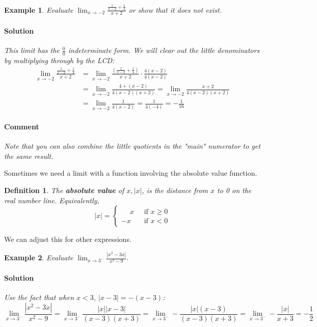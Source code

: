 \documentclass[letterpaper, 11pt, openany]{book}
\theoremstyle{mytheoremstyle}
\newtheorem{definition}{Definition}[section]
\theoremstyle{myexamplestyle}
\newtheorem{example}{Example}[section]
\newenvironment{solution}{\paragraph{\sffamily \smaller \fontseries{b}\selectfont Solution}}{\hfill\faSquare}
\newenvironment{commentary}{\paragraph{\sffamily \smaller \fontseries{b}\selectfont Comment}}{}
\begin{document}
\begin{example}\label{e:limit-rational-functions}
    Evaluate $\displaystyle \lim_{x\to -2} \frac{\frac{1}{x - 2} + \frac{1}{4}}{x + 2}$ or show that it does not exist.
    \begin{solution}
        This limit has the $\frac{0}{0}$ indeterminate form. We will clear out the little denominators by multiplying through by the LCD:
        \begin{align*}
            \lim_{x\to -2} \frac{\frac{1}{x - 2} + \frac{1}{4}}{x + 2}  &= \lim_{x\to -2} \frac{\left(\frac{1}{x - 2} + \frac{1}{4}\right)}{x + 2} \cdot \frac{4(x - 2)}{4(x - 2)} \\
                                                                        &= \lim_{x\to -2} \frac{4 + (x-2)}{4(x-2)(x+2)} = \lim_{x\to -2}\frac{x + 2}{4(x-2)(x+2)}\\
                                                                        &= \lim_{x\to -2} \frac{1}{4(x-2)} = \frac{1}{4(-4)} = -\frac{1}{16}
        \end{align*} 
    \end{solution}
    \begin{commentary}
        Note that you can also combine the little quotients in the "main" numerator to get the same result.
    \end{commentary}
\end{example}
Sometimes we need a limit with a function involving the absolute value function.
\begin{definition}\label{d:abs-val}
    The \textbf{absolute value} of \(x, |x| \), is the distance from \(x\) to 0 on the real number line. Equivalently,
    \[ |x| = 
    \begin{cases}
        \phantom{-}x \; &\text{ if } x \ge 0\\
        -x \; &\text{ if } x < 0
    \end{cases}
    \]
\end{definition}
We can adjust this for other expressions.

\begin{example}\label{e:limit-absval}
    Evaluate \(\displaystyle \lim_{x \to 3^{-}} \frac{|x^{2} - 3x|}{x^{2}-9}\).
    \begin{solution}
        Use the fact that when \(x<3\), \(|x-3| = -(x-3)\):
        \[\lim_{x \to 3^{-}} \frac{|x^{2} - 3x|}{x^{2}-9} = \lim_{x \to 3^{-}} \frac{|x||x-3|}{(x-3)(x+3)} = \lim_{x \to 3^{-}} -\frac{|x|(x-3)}{(x-3)(x+3)} = \lim_{x \to 3^{-}} -\frac{|x|}{x+3} = -\frac{1}{2}\]
    \end{solution}
\end{example}
\end{document}
